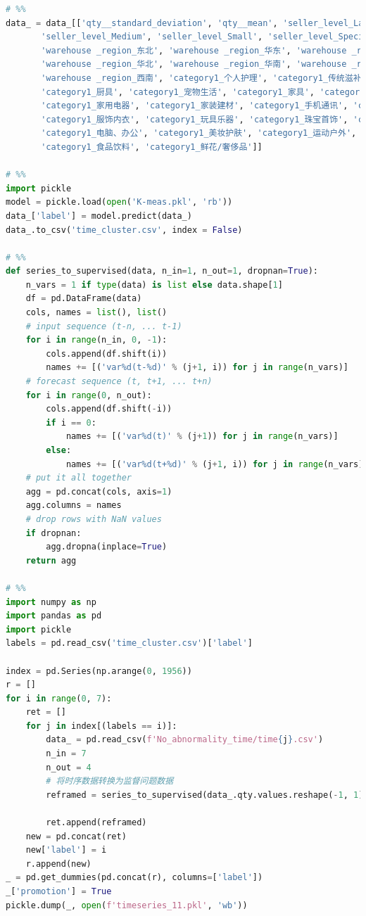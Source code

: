 \documentclass[withoutpreface,bwprint]{cumcmthesis}
\begin{document}
\begin{lstlisting}[language=python]
# %%
data_ = data_[['qty__standard_deviation', 'qty__mean', 'seller_level_Large',
       'seller_level_Medium', 'seller_level_Small', 'seller_level_Special',
       'warehouse _region_东北', 'warehouse _region_华东', 'warehouse _region_华中',
       'warehouse _region_华北', 'warehouse _region_华南', 'warehouse _region_西北',
       'warehouse _region_西南', 'category1_个人护理', 'category1_传统滋补',
       'category1_厨具', 'category1_宠物生活', 'category1_家具', 'category1_家庭清洁/纸品',
       'category1_家用电器', 'category1_家装建材', 'category1_手机通讯', 'category1_数码',
       'category1_服饰内衣', 'category1_玩具乐器', 'category1_珠宝首饰', 'category1_生活日用',
       'category1_电脑、办公', 'category1_美妆护肤', 'category1_运动户外', 'category1_酒类',
       'category1_食品饮料', 'category1_鲜花/奢侈品']]

# %%
import pickle
model = pickle.load(open('K-meas.pkl', 'rb'))
data_['label'] = model.predict(data_)
data_.to_csv('time_cluster.csv', index = False)

# %%
def series_to_supervised(data, n_in=1, n_out=1, dropnan=True):
    n_vars = 1 if type(data) is list else data.shape[1]
    df = pd.DataFrame(data)
    cols, names = list(), list()
    # input sequence (t-n, ... t-1)
    for i in range(n_in, 0, -1):
        cols.append(df.shift(i))
        names += [('var%d(t-%d)' % (j+1, i)) for j in range(n_vars)]
    # forecast sequence (t, t+1, ... t+n)
    for i in range(0, n_out):
        cols.append(df.shift(-i))
        if i == 0:
            names += [('var%d(t)' % (j+1)) for j in range(n_vars)]
        else:
            names += [('var%d(t+%d)' % (j+1, i)) for j in range(n_vars)]
    # put it all together
    agg = pd.concat(cols, axis=1)
    agg.columns = names
    # drop rows with NaN values
    if dropnan:
        agg.dropna(inplace=True)
    return agg

# %%
import numpy as np
import pandas as pd
import pickle
labels = pd.read_csv('time_cluster.csv')['label']

index = pd.Series(np.arange(0, 1956))
r = []
for i in range(0, 7):
    ret = []
    for j in index[(labels == i)]:
        data_ = pd.read_csv(f'No_abnormality_time/time{j}.csv')
        n_in = 7
        n_out = 4
        # 将时序数据转换为监督问题数据
        reframed = series_to_supervised(data_.qty.values.reshape(-1, 1), n_in, n_out)    
        
        ret.append(reframed)
    new = pd.concat(ret)
    new['label'] = i
    r.append(new)
_ = pd.get_dummies(pd.concat(r), columns=['label'])
_['promotion'] = True
pickle.dump(_, open(f'timeseries_11.pkl', 'wb'))


\end{lstlisting}
\end{document}
